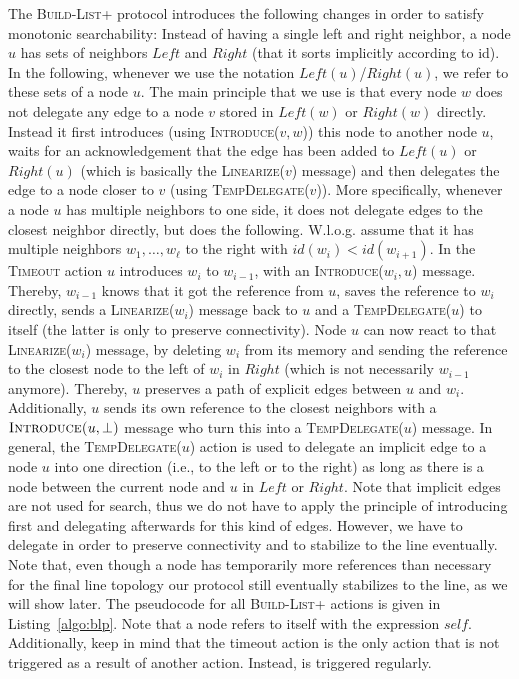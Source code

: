 \documentclass[a4paper,USenglish]{lipics}
\newcommand{\blp}{\textsc{Build-List+}\xspace}
\newcommand{\linearize}[1]{\textsc{Linearize(\ensuremath{#1})}\xspace}
\newcommand{\introduce}[1]{\textsc{Introduce(\ensuremath{#1})}\xspace}
\newcommand{\tempdelegate}[1]{\textsc{TempDelegate(\ensuremath{#1})}\xspace}
\newcommand{\timeout}{\textsc{Timeout}\xspace}
\begin{document}
The \blp protocol introduces the following changes in order to satisfy monotonic searchability:
Instead of having a single left and right neighbor, a node $u$ has sets of neighbors $Left$ and $Right$ (that it sorts implicitly according to id).
In the following, whenever we use the notation $Left(u)$/$Right(u)$, we refer to these sets of a node $u$.
The main principle that we use is that every node $w$ does not delegate any edge to a node $v$ stored in $Left(w)$ or $Right(w)$ directly.
Instead it first introduces (using \introduce{v,w}) this node to another node $u$, waits for an acknowledgement that the edge has been added to $Left(u)$ or $Right(u)$ (which is basically the \linearize{v} message) and then delegates the edge to a node closer to $v$ (using \tempdelegate{v}).
More specifically, whenever a node $u$ has multiple neighbors to one side, it does not delegate edges to the closest neighbor directly, but does the following.
W.l.o.g. assume that it has multiple neighbors $w_1,\ldots,w_\ell$ to the right with $id(w_i)<id(w_{i+1})$.
In the \timeout action $u$ introduces $w_i$ to $w_{i-1}$, with an \introduce{w_i,u} message.
Thereby, $w_{i-1}$ knows that it got the reference from $u$, saves the reference to $w_i$ directly, sends a \linearize{w_i} message back to $u$ and a \tempdelegate{u} to itself (the latter is only to preserve connectivity).
Node $u$ can now react to that \linearize{w_i} message, by deleting $w_i$ from its memory and sending the reference to the closest node to the left of $w_i$ in $Right$ (which is not necessarily $w_{i-1}$ anymore). 
Thereby, $u$ preserves a path of explicit edges between $u$ and $w_i$.
Additionally, $u$ sends its own reference to the closest neighbors with a $\introduce{u,\bot}$ message who turn this into a \tempdelegate{u} message.
In general, the \tempdelegate{u} action is used to delegate an implicit edge to a node $u$ into one direction (i.e., to the left or to the right) as long as there is a node between the current node and $u$ in $Left$ or $Right$.
Note that implicit edges are not used for search, thus we do not have to apply the principle of introducing first and delegating afterwards for this kind of edges.
However, we have to delegate in order to preserve connectivity and to stabilize to the line eventually.
Note that, even though a node has temporarily more references than necessary for the final line topology our protocol still eventually stabilizes to the line, as we will show later.
The pseudocode for all \blp actions is given in Listing~\ref{algo:blp}.
Note that a node refers to itself with the expression $self$.
Additionally, keep in mind that the timeout action is the only action that is not triggered as a result of another action.
Instead, is triggered regularly.
\end{document}
